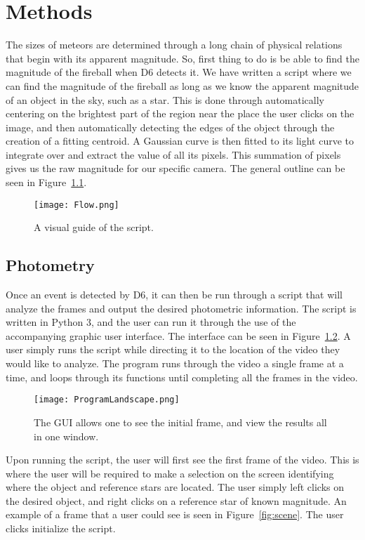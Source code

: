\chapter{Methods}

The sizes of meteors are determined through a long chain of physical relations that begin with its apparent magnitude. So, first thing to do is be able to find the magnitude of the fireball when D6 detects it. We have written a script where we can find the magnitude of the fireball as long as we know the apparent magnitude of an object in the sky, such as a star. This is done through automatically centering on the brightest part of the region near the place the user clicks on the image, and then automatically detecting the edges of the  object through the creation of a fitting centroid. A Gaussian curve is then fitted to its light curve to integrate over and extract the value of all its pixels. This summation of pixels gives us the raw magnitude for our specific camera. The general outline can be seen in Figure~\ref{fig:flowchart}.

\begin{figure}[htpb]
	\centering
	\texttt{[image: Flow.png]}
	\caption{A visual guide of the script.}
	\label{fig:flowchart}
\end{figure}

\section{Photometry}

Once an event is detected by D6, it can then be run through a script that will analyze the frames and output the desired photometric information. The script is written in Python 3, and the user can run it through the use of the accompanying graphic user interface. The interface can be seen in Figure~\ref{fig:gui}. A user simply runs the script while directing it to the location of the video they would like to analyze. The program runs through the video a single frame at a time, and loops through its functions until completing all the frames in the video.

\begin{figure}[htpb]
	\centering
	\texttt{[image: ProgramLandscape.png]}
	\caption{The GUI allows one to see the initial frame, and view the results all in one window.}
	\label{fig:gui}
\end{figure}
Upon running the script, the user will first see the first frame of the video. This is where the user will be required to make a selection on the screen identifying where the object and reference stars are located. The user simply left clicks on the desired object, and right clicks on a reference star of known magnitude. An example of a frame that a user could see is seen in Figure~\ref{fig:scene}. The user clicks initialize the script. 

